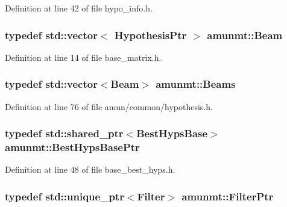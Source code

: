 Definition at line 42 of file hypo\+\_\+info.\+h.

\subsubsection[{\texorpdfstring{Beam}{Beam}}]{\setlength{\rightskip}{0pt plus 5cm}typedef std\+::vector$<$ {\bf Hypothesis\+Ptr} $>$ {\bf amunmt\+::\+Beam}}\hypertarget{namespaceamunmt_a534a3a9a1d99c01a5adf05e700a26012}{}\label{namespaceamunmt_a534a3a9a1d99c01a5adf05e700a26012}


Definition at line 14 of file base\+\_\+matrix.\+h.

\subsubsection[{\texorpdfstring{Beams}{Beams}}]{\setlength{\rightskip}{0pt plus 5cm}typedef std\+::vector$<${\bf Beam}$>$ {\bf amunmt\+::\+Beams}}\hypertarget{namespaceamunmt_a90a1b353bc62cb90bc8e8da7edc3edc0}{}\label{namespaceamunmt_a90a1b353bc62cb90bc8e8da7edc3edc0}


Definition at line 76 of file amun/common/hypothesis.\+h.

\subsubsection[{\texorpdfstring{Best\+Hyps\+Base\+Ptr}{BestHypsBasePtr}}]{\setlength{\rightskip}{0pt plus 5cm}typedef std\+::shared\+\_\+ptr$<${\bf Best\+Hyps\+Base}$>$ {\bf amunmt\+::\+Best\+Hyps\+Base\+Ptr}}\hypertarget{namespaceamunmt_a4a9522da34de52554ec07cedc30361b8}{}\label{namespaceamunmt_a4a9522da34de52554ec07cedc30361b8}


Definition at line 48 of file base\+\_\+best\+\_\+hyps.\+h.

\subsubsection[{\texorpdfstring{Filter\+Ptr}{FilterPtr}}]{\setlength{\rightskip}{0pt plus 5cm}typedef std\+::unique\+\_\+ptr$<${\bf Filter}$>$ {\bf amunmt\+::\+Filter\+Ptr}}\hypertarget{namespaceamunmt_a03c308343fcd4b59ebe53d562257e483}{}\label{namespaceamunmt_a03c308343fcd4b59ebe53d562257e483}



